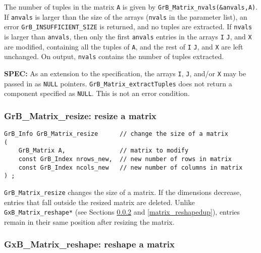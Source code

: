 \documentclass[12pt]{article}
\begin{document}
The number of tuples in the matrix \verb'A' is given by
\verb'GrB_Matrix_nvals(&anvals,A)'.  If \verb'anvals' is larger than the size
of the arrays (\verb'nvals' in the parameter list), an error
\verb'GrB_INSUFFICIENT_SIZE' is returned, and no tuples are extracted.  If
\verb'nvals' is larger than \verb'anvals', then only the first \verb'anvals'
entries in the arrays \verb'I' \verb'J', and \verb'X' are modified, containing
all the tuples of \verb'A', and the rest of \verb'I' \verb'J', and \verb'X' are
left unchanged.  On output, \verb'nvals' contains the number of tuples
extracted.

\begin{alert}
{\bf SPEC:} As an extension to the specification, the arrays \verb'I', \verb'J', and/or
\verb'X' may be passed in as \verb'NULL' pointers.
\verb'GrB_Matrix_extractTuples' does not return a component specified as
\verb'NULL'.  This is not an error condition.
\end{alert}

\subsubsection{{\sf GrB\_Matrix\_resize:}          resize a matrix}
\label{matrix_resize}

\begin{mdframed}[userdefinedwidth=6in]
{\footnotesize
\begin{verbatim}
GrB_Info GrB_Matrix_resize      // change the size of a matrix
(
    GrB_Matrix A,               // matrix to modify
    const GrB_Index nrows_new,  // new number of rows in matrix
    const GrB_Index ncols_new   // new number of columns in matrix
) ;
\end{verbatim} } \end{mdframed}

\verb'GrB_Matrix_resize' changes the size of a matrix.  If the dimensions
decrease, entries that fall outside the resized matrix are deleted.  Unlike
\verb'GxB_Matrix_reshape*' (see Sections \ref{matrix_reshape} and
\ref{matrix_reshapedup}), entries remain in their same position after resizing
the matrix.

\newpage
\subsubsection{{\sf GxB\_Matrix\_reshape:} reshape a matrix}
\label{matrix_reshape}
\end{document}
